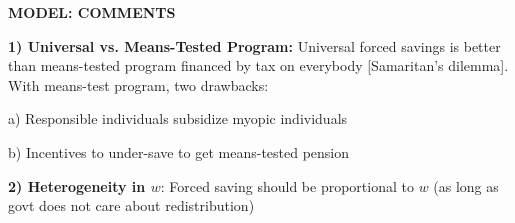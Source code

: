 \documentclass[landscape]{slides}
\begin{document}
\begin{slide}

\end{slide}


\begin{slide}
\begin{center}
{\bf MODEL: COMMENTS}
\end{center}

{\bf 1) Universal vs. Means-Tested Program:} Universal forced savings is better than means-tested program financed by tax on everybody [Samaritan's dilemma]. With means-test program, two drawbacks:

a) Responsible individuals subsidize myopic individuals 

b) Incentives to under-save to get means-tested pension

{\bf 2) Heterogeneity in $w$}: Forced saving should be
proportional to $w$ (as long as govt does not care about
redistribution)

%
%
%

\end{slide}



%
%
\end{document}
